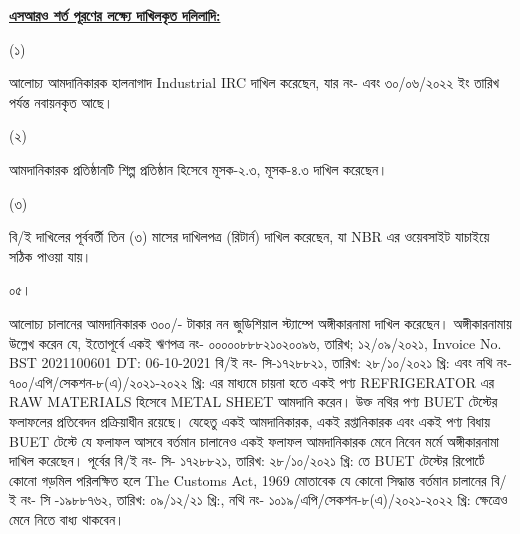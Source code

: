 \documentclass[12pt]{article}
\newcommand{\ircno}{\jealirc}
\newcommand{\ircrenewdt}{৩০/০৬/২০২২ ইং}
\begin{document}
\begin{minipage}[t]{0.95\linewidth}
\underline{\textbf{এসআরও শর্ত পূরণের লক্ষ্যে
দাখিলকৃত দলিলাদি:}}
\end{minipage}
\begin{minipage}[t]{0.05\linewidth}
\hspace{0em}
\end{minipage}
\begin{minipage}[t]{0.05\linewidth}
(১)
\end{minipage}
\begin{minipage}[t]{0.90\linewidth}
আলোচ্য আমদানিকারক হালনাগাদ Industrial IRC
দাখিল করেছেন, যার নং- {\ircno} এবং
{\ircrenewdt} তারিখ পর্যন্ত নবায়নকৃত আছে।
\end{minipage}
\begin{minipage}[t]{0.05\linewidth}
\hspace{0em}
\end{minipage}
\begin{minipage}[t]{0.05\linewidth}
(২)
\end{minipage}
\begin{minipage}[t]{0.90\linewidth}
আমদানিকারক প্রতিষ্ঠানটি শিল্প প্রতিষ্ঠান হিসেবে
মূসক-২.৩, মূসক-৪.৩ দাখিল করেছেন।
\end{minipage}
\begin{minipage}[t]{0.05\linewidth}
\hspace{0em}
\end{minipage}
\begin{minipage}[t]{0.05\linewidth}
(৩)
\end{minipage}
\begin{minipage}[t]{0.90\linewidth}
বি/ই দাখিলের পূর্ববর্তী তিন (৩) মাসের দাখিলপত্র
(রিটার্ন) দাখিল করেছেন, যা NBR এর ওয়েবসাইট
যাচাইয়ে সঠিক পাওয়া যায়।
\\
\end{minipage}
\begin{minipage}[t]{0.05\linewidth}
০৫।
\end{minipage}
\begin{minipage}[t]{0.95\linewidth}
আলোচ্য চালানের আমদানিকারক ৩০০/- টাকার নন জুডিশিয়াল স্ট্যাম্পে অঙ্গীকারনামা দাখিল করেছেন। অঙ্গীকারনামায় উল্লেখ করেন যে,
ইতোপূর্বে একই ঋণপত্র নং- ০০০০০৮৮৮২১০২০০৯৬, তারিখ; ১২/০৯/২০২১, Invoice No. BST 2021100601 DT: 06-10-2021 বি/ই নং- সি-১৭২৮৮২১, তারিখ: ২৮/১০/২০২১ খ্রি: এবং নথি নং- ৭০০/এপি/সেকশন-৮(এ)/২০২১-২০২২ খ্রি: এর মাধ্যমে চায়না হতে
একই পণ্য REFRIGERATOR এর RAW MATERIALS হিসেবে METAL SHEET আমদানি করেন। উক্ত নথির পণ্য BUET টেস্টের ফলাফলের প্রতিবেদন প্রক্রিয়াধীন রয়েছে। যেহেতু একই আমদানিকারক, একই রপ্তানিকারক এবং একই পণ্য বিধায় BUET টেস্টে যে ফলাফল আসবে বর্তমান চালানেও একই ফলাফল আমদানিকারক মেনে নিবেন মর্মে অঙ্গীকারনামা দাখিল করেছেন। পূর্বের বি/ই নং- সি- ১৭২৮৮২১, তারিখ: ২৮/১০/২০২১ খ্রি: তে BUET টেস্টের রিপোর্টে কোনো গড়মিল পরিলক্ষিত হলে
The Customs Act, 1969 মোতাবেক যে কোনো সিদ্ধান্ত
বর্তমান চালানের বি/ই নং- সি -১৯৮৮৭৬২, তারিখ: ০৯/১২/২১ খ্রি:, নথি নং- ১০১৯/এপি/সেকশন-৮(এ)/২০২১-২০২২ খ্রি: ক্ষেত্রেও মেনে নিতে বাধ্য থাকবেন।
\\
\end{minipage}
\end{document}
